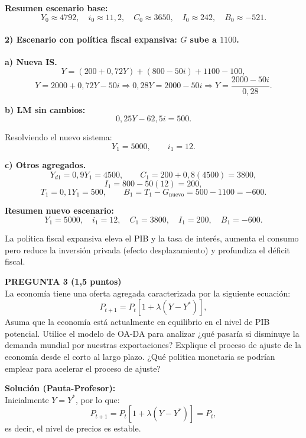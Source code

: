 \documentclass[11pt,addpoints]{article}
\begin{document}
\medskip
\textbf{Resumen escenario base:}
\[
Y_0 \approx 4792,\quad i_0 \approx 11{,}2,\quad
C_0 \approx 3650,\quad I_0 \approx 242,\quad B_0 \approx -521.
\]

\paragraph{2) Escenario con política fiscal expansiva: $G$ sube a $1100$.}

\textbf{a) Nueva IS.}
\[
Y = (200 + 0{,}72Y) + (800 - 50i) + 1100 - 100,
\]
\[
Y = 2000 + 0{,}72Y - 50i \Rightarrow 
0{,}28Y = 2000 - 50i \Rightarrow
Y = \frac{2000 - 50i}{0{,}28}.
\]

\textbf{b) LM sin cambios:}
\[
0{,}25Y - 62{,}5i = 500.
\]

Resolviendo el nuevo sistema:
\[
Y_1 = 5000,\qquad i_1 = 12.
\]

\textbf{c) Otros agregados.}
\[
Y_{d1} = 0{,}9Y_1 = 4500,\qquad
C_1 = 200 + 0{,}8(4500) = 3800,
\]
\[
I_1 = 800 - 50(12) = 200,
\]
\[
T_1 = 0{,}1Y_1 = 500,\qquad
B_1 = T_1 - G_{\text{nuevo}} = 500 - 1100 = -600.
\]

\medskip
\textbf{Resumen nuevo escenario:}
\[
Y_1 = 5000,\quad i_1 = 12,\quad C_1 = 3800,\quad I_1 = 200,\quad B_1 = -600.
\]

La política fiscal expansiva eleva el PIB y la tasa de interés, aumenta el consumo pero reduce la inversión privada (efecto desplazamiento) y profundiza el déficit fiscal.

\vspace{0.4cm}

\textbf{PREGUNTA 3 (1,5 puntos)}\\[0.2cm]
La economía tiene una oferta agregada caracterizada por la siguiente ecuación:
\[
P_{t+1} = P_{t}\left[1 + \lambda (Y - Y^*)\right],
\]
Asuma que la economía está actualmente en equilibrio en el nivel de PIB potencial. Utilice el modelo de OA-DA para analizar ¿qué pasaría si disminuye la demanda mundial por nuestras exportaciones? Explique el proceso de ajuste de la economía desde el corto al largo plazo. ¿Qué politica monetaria se podrían emplear para acelerar el proceso de ajuste?

\vspace{0.2cm}
\textbf{Solución (Pauta-Profesor):}\\
Inicialmente $Y = Y^*$, por lo que:
\[
P_{t+1} = P_t[1 + \lambda(Y - Y^*)] = P_t,
\]
es decir, el nivel de precios es estable.

\newpage
\vspace*{0.5cm}
\end{document}
